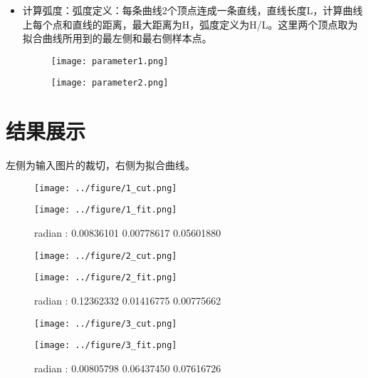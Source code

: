 \documentclass{article}
\begin{document}
\begin{itemize}
\item
  计算弧度：弧度定义：每条曲线2个顶点连成一条直线，直线长度L，计算曲线上每个点和直线的距离，最大距离为H，弧度定义为H/L。这里两个顶点取为拟合曲线所用到的最左侧和最右侧样本点。\\
  \begin{figure}[H]
  \begin{minipage}{0.5\linewidth}
  \centerline{\texttt{[image: parameter1.png]}}
  \end{minipage}
  \hfill
  \begin{minipage}{0.5\linewidth}
  \centerline{\texttt{[image: parameter2.png]}}
  \end{minipage}
  \end{figure}
\end{itemize}


\section{结果展示}

左侧为输入图片的裁切，右侧为拟合曲线。

\begin{figure}[H]
\begin{minipage}{0.48\linewidth}
  \centerline{\texttt{[image: ../figure/1\_cut.png]}}
\end{minipage}
\hfill
\begin{minipage}{0.48\linewidth}
  \centerline{\texttt{[image: ../figure/1\_fit.png]}}
\end{minipage}
\caption{radian : 0.00836101 0.00778617 0.05601880}
\end{figure}


\begin{figure}[H]
\begin{minipage}{0.48\linewidth}
  \centerline{\texttt{[image: ../figure/2\_cut.png]}}
\end{minipage}
\hfill
\begin{minipage}{0.48\linewidth}
  \centerline{\texttt{[image: ../figure/2\_fit.png]}}
\end{minipage}
\caption{radian : 0.12362332 0.01416775 0.00775662}
\end{figure}


\begin{figure}[H]
\begin{minipage}{0.48\linewidth}
  \centerline{\texttt{[image: ../figure/3\_cut.png]}}
\end{minipage}
\hfill
\begin{minipage}{0.48\linewidth}
  \centerline{\texttt{[image: ../figure/3\_fit.png]}}
\end{minipage}
\caption{radian : 0.00805798 0.06437450 0.07616726}
\end{figure}
\end{document}
